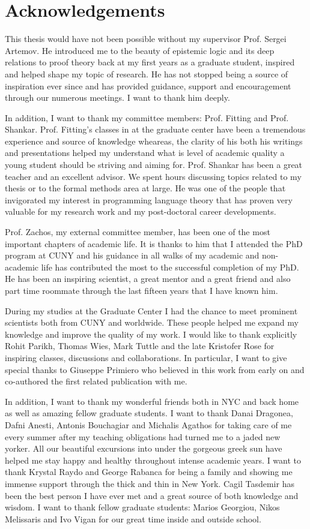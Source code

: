 \section*{Acknowledgements}
This thesis would have not been possible without my supervisor Prof. Sergei Artemov.
He introduced me to the beauty of epistemic logic and its deep relations to proof theory
back at my first years as a graduate student, inspired and helped shape my topic of research. 
He has not stopped being a source of inspiration ever
since and has provided guidance, support and encouragement through our numerous meetings. 
I want to thank him deeply.

In addition, I want to thank my committee members: Prof. Fitting and Prof. Shankar. Prof. Fitting's classes
in at the graduate center have been a tremendous experience and source of knowledge wheareas,
the clarity of his both his writings and presentations helped my understand what is 
level of academic quality a young student should be striving and aiming for. Prof. Shankar has
been a great teacher and an excellent advisor. We spent hours 
discussing topics related to my thesis or to the formal methods area at large. He was one
of the people that invigorated my interest in programming language theory that has
proven very valuable for my research work and my post-doctoral career developments.

Prof. Zachos, my external committee member, has been one of the most important
chapters of academic life. It is thanks to him that I attended the PhD program at CUNY
and his guidance in all walks of my academic and non-academic life has contributed 
the most  to the successful completion of my PhD. He has been an inspiring
scientist, a great mentor and a great friend and also part time roommate through the last fifteen years that I have 
known him. 

During my studies at the Graduate Center I had the chance to meet 
prominent scientists both from CUNY and worldwide. 
These people helped me expand my knowledge and improve
the quality of my work. I would like to thank explicitly Rohit Parikh, Thomas Wies,  
 Mark Tuttle and the late Kristofer Rose for inspiring classes, discussions and collaborations.
In particular, I want to give special thanks to Giuseppe Primiero who believed in this work
from early on and co-authored the first related publication with me.

In addition, I want to thank my wonderful friends both in NYC and back home as well as 
amazing fellow graduate students. I want to thank Danai Dragonea, Dafni Anesti, Antonis Bouchagiar 
and Michalis Agathos for taking care of me every summer after my teaching obligations
had turned me to a jaded new yorker. All our beautiful excursions into under the gorgeous
greek sun have helped me stay happy and healthy throughout intense academic years.
I want to thank Krystal Raydo and George Rabanca for being a family and showing me immense support
through the thick and thin in New York. 
Cagil Tasdemir has been the best person I have ever met and a great source of both knowledge and wisdom.
I want to thank fellow graduate students: Marios Georgiou,
Nikos Melissaris and Ivo Vigan for our great time inside and outside school.

